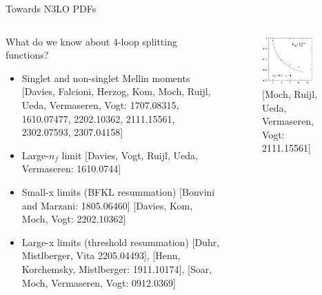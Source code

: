\documentclass[aspectratio=169, 8pt,t]{beamer}
\begin{document}
\begin{frame}{Towards N3LO PDFs}
\begin{columns}[T]
\begin{column}{0.59\textwidth}
      \vspace*{1em}
      What do we know about 4-loop splitting functions?
      \begin{itemize}
        \item Singlet and non-singlet Mellin moments
        {\color{gray}\small [Davies, Falcioni, Herzog, Kom, Moch, Ruijl, Ueda, Vermaseren, Vogt: 1707.08315, 1610.07477, 2202.10362, 2111.15561, 2302.07593, 2307.04158]}
        \item Large-$n_f$ limit {\color{gray}\small [Davies, Vogt, Ruijl, Ueda, Vermaseren: 1610.0744]}
        \item Small-x limits (BFKL resummation) {\color{gray}\small [Bonvini and Marzani: 1805.06460] [Davies, Kom, Moch, Vogt: 2202.10362]}
        \item Large-x limits (threshold resummation) {\color{gray}\small [Duhr, Mistlberger, Vita 2205.04493], [Henn, Korchemsky, Mistlberger: 1911.10174], [Soar, Moch, Vermaseren, Vogt: 0912.0369]}
      \end{itemize}
    \end{column}
    \begin{column}{0.39\textwidth}
      \begin{figure}
        \includegraphics[width=0.8\textwidth]{figures/splittingmoments.png}
        \caption*{\color{gray}\small[Moch, Ruijl, Ueda, Vermaseren, Vogt: 2111.15561]}
      \end{figure}
    \end{column}
  \end{columns}


\end{frame}
\end{document}
